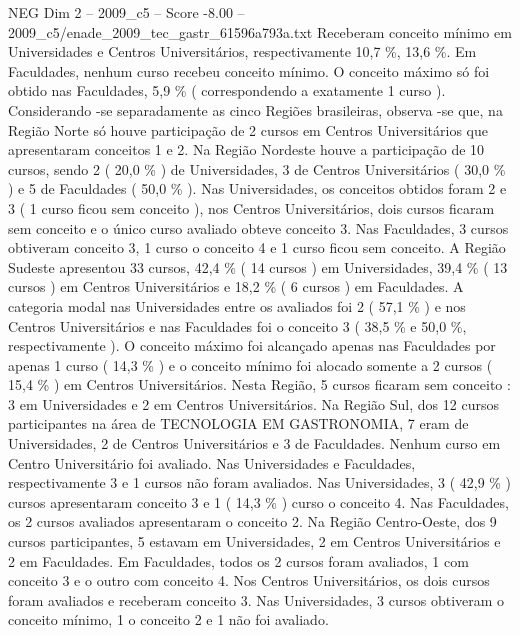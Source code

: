 \begin{textsample}{NEG Dim 2 – 2009\_c5 – Score -8.00 – 2009\_c5/enade\_2009\_tec\_gastr\_61596a793a.txt}
Receberam conceito mínimo em Universidades e Centros Universitários, respectivamente 10,7 \%, 13,6 \%.
Em Faculdades, nenhum curso recebeu conceito mínimo.
O conceito máximo só foi obtido nas Faculdades, 5,9 \% ( correspondendo a exatamente 1 curso ).
Considerando -se separadamente as cinco Regiões brasileiras, observa -se que, na Região Norte só houve participação de 2 cursos em Centros Universitários que apresentaram conceitos 1 e 2.
Na Região Nordeste houve a participação de 10 cursos, sendo 2 ( 20,0 \% ) de Universidades, 3 de Centros Universitários ( 30,0 \% ) e 5 de Faculdades ( 50,0 \% ).
Nas Universidades, os conceitos obtidos foram 2 e 3 ( 1 curso ficou sem conceito ), nos Centros Universitários, dois cursos ficaram sem conceito e o único curso avaliado obteve conceito 3.
Nas Faculdades, 3 cursos obtiveram conceito 3, 1 curso o conceito 4 e 1 curso ficou sem conceito.
A Região Sudeste apresentou 33 cursos, 42,4 \% ( 14 cursos ) em Universidades, 39,4 \% ( 13 cursos ) em Centros Universitários e 18,2 \% ( 6 cursos ) em Faculdades.
A categoria modal nas Universidades entre os avaliados foi 2 ( 57,1 \% ) e nos Centros Universitários e nas Faculdades foi o conceito 3 ( 38,5 \% e 50,0 \%, respectivamente ).
O conceito máximo foi alcançado apenas nas Faculdades por apenas 1 curso ( 14,3 \% ) e o conceito mínimo foi alocado somente a 2 cursos ( 15,4 \% ) em Centros Universitários.
Nesta Região, 5 cursos ficaram sem conceito : 3 em Universidades e 2 em Centros Universitários.
Na Região Sul, dos 12 cursos participantes na área de TECNOLOGIA EM GASTRONOMIA, 7 eram de Universidades, 2 de Centros Universitários e 3 de Faculdades.
Nenhum curso em Centro Universitário foi avaliado.
Nas Universidades e Faculdades, respectivamente 3 e 1 cursos não foram avaliados.
Nas Universidades, 3 ( 42,9 \% ) cursos apresentaram conceito 3 e 1 ( 14,3 \% ) curso o conceito 4.
Nas Faculdades, os 2 cursos avaliados apresentaram o conceito 2.
Na Região Centro-Oeste, dos 9 cursos participantes, 5 estavam em Universidades, 2 em Centros Universitários e 2 em Faculdades.
Em Faculdades, todos os 2 cursos foram avaliados, 1 com conceito 3 e o outro com conceito 4.
Nos Centros Universitários, os dois cursos foram avaliados e receberam conceito 3.
Nas Universidades, 3 cursos obtiveram o conceito mínimo, 1 o conceito 2 e 1 não foi avaliado.

\end{textsample}
